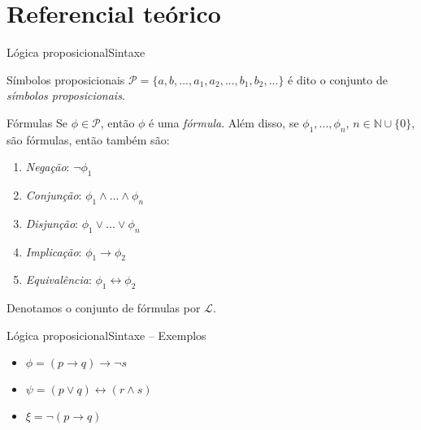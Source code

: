 
\section{Referencial teórico}

\begin{frame}{Lógica proposicional}{Sintaxe}
	\vspace{-.2cm}
	\begin{footnotesize}
	\begin{block}{Símbolos proposicionais}
		$\mathcal{P} = \{a,b,...,a_1,a_2,...,b_1,b_2,... \}$ é dito o conjunto de \emph{símbolos proposicionais}.
	\end{block}
	\pause
	\vspace{-.2cm}
	\begin{block}{Fórmulas}
		Se $\phi \in \mathcal{P}$, então $\phi$ é uma \emph{fórmula}. Além disso, se $\phi_1,...,\phi_n$, $n \in \mathbb{N} \cup \{0 \}$, são fórmulas, então também são:
		\begin{enumerate}
			\pause\item \emph{Negação}: $\neg \phi_1$
			\pause\item \emph{Conjunção}: $\phi_1 \wedge ... \wedge \phi_n$
			\pause\item \emph{Disjunção}: $\phi_1 \vee ... \vee \phi_n$
			\pause\item \emph{Implicação}: $\phi_1 \rightarrow \phi_2$
			\pause\item \emph{Equivalência}: $\phi_1 \leftrightarrow \phi_2$
		\end{enumerate}
		\pause Denotamos o conjunto de fórmulas por $\mathcal{L}$.
	\end{block}
	\end{footnotesize}
\end{frame}

\begin{frame}{Lógica proposicional}{Sintaxe -- Exemplos}
	\begin{itemize}
		\item $\phi = (p \rightarrow q) \rightarrow \neg s$
		\pause\item $\psi = (p \vee q) \leftrightarrow (r \wedge s)$
		\pause\item $\xi  = \neg(p \rightarrow q)$
	\end{itemize}
\end{frame}

